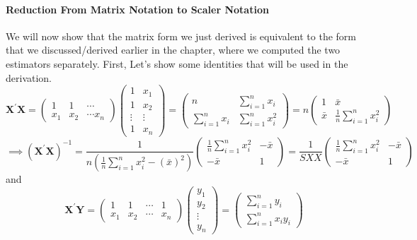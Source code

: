 \documentclass[11pt]{article}
\begin{document}
\paragraph{Reduction From Matrix Notation to Scaler Notation} We will now show that the matrix form we just derived is equivalent to the form that we discussed/derived earlier in the chapter, where we computed the two estimators separately.
First, Let's show some identities that will be used in the derivation.
\begin{equation*}
	\mathbf{X}^{\prime} \mathbf{X}=\left(\begin{array}{ccc}{1} & {1} & {\cdots} \\ {x_{1}} & {x_{2}} & {\cdots x_{n}}\end{array}\right)\left(\begin{array}{cc}{1} & {x_{1}} \\ {1} & {x_{2}} \\ {\vdots} & {\vdots} \\ {1} & {x_{n}}\end{array}\right)=\left(\begin{array}{cc}{n} & {\sum_{i=1}^{n} x_{i}} \\ {\sum_{i=1}^{n} x_{i}} & {\sum_{i=1}^{n} x_{i}^{2}}\end{array}\right)=n\left(\begin{array}{cc}{1} & {\bar{x}} \\ {\bar{x}} & {\frac{1}{n} \sum_{i=1}^{n} x_{i}^{2}}\end{array}\right)
\end{equation*}
\begin{equation*}
	\implies \left(\mathbf{X}^{\prime} \mathbf{X}\right)^{-1}=\frac{1}{n\left(\frac{1}{n} \sum_{i=1}^{n} x_{i}^{2}-(\bar{x})^{2}\right)}\left(\begin{array}{cc}{\frac{1}{n} \sum_{i=1}^{n} x_{i}^{2}} & {-\bar{x}} \\ {-\bar{x}} & {1}\end{array}\right) = \frac{1}{S X X}\left(\begin{array}{cc}{\frac{1}{n} \sum_{i=1}^{n} x_{i}^{2}} & {-\bar{x}} \\ {-\bar{x}} & {1}\end{array}\right)
\end{equation*}
and
\begin{equation*}
	\mathbf{X}^{\prime} \mathbf{Y}=\left(\begin{array}{cccc}{1} & {1} & {\cdots} & {1} \\ {x_{1}} & {x_{2}} & {\cdots} & {x_{n}}\end{array}\right) \left(\begin{array}{c}{y_{1}} \\ {y_{2}} \\ {\vdots} \\ {y_{n}}\end{array}\right) = \left(\begin{array}{c}{\sum_{i=1}^{n} y_{i}} \\ {\sum_{i=1}^{n} x_{i} y_{i}}\end{array}\right)
\end{equation*}
\end{document}

